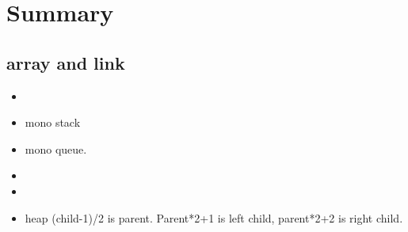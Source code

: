 \documentclass[a4paper,11pt,twoside]{book}
\begin{document}
\chapter{Summary}
\section{array and link}
\begin{itemize}
	\item %
	\item mono stack
	\item mono queue. 
	\item %
	
	\item %
	
	\item heap (child-1)/2 is parent.  Parent*2+1 is left child, parent*2+2 is right child.
\end{itemize}
\end{document}
